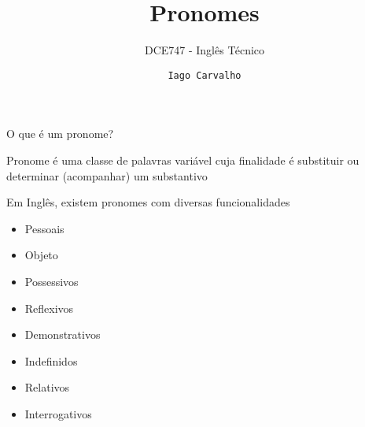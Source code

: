 \documentclass[compress,mathserif,xcolor=table]{beamer}
\title{Pronomes}
\subtitle{DCE747 - Inglês Técnico}
\author{\texttt{Iago Carvalho}}
\institute{\texttt{Departamento de Ciência da Computação}}
\begin{document}
\begin{frame}
\titlepage

\end{frame}


\begin{frame}{O que é um pronome?}

Pronome é uma classe de palavras variável cuja finalidade é substituir ou determinar (acompanhar) um substantivo

\vspace{0.5cm}

Em Inglês, existem pronomes com diversas funcionalidades
\begin{itemize} 
    \item Pessoais
    \item Objeto
    \item Possessivos
    \item Reflexivos
    \item Demonstrativos
    \item Indefinidos
    \item Relativos
    \item Interrogativos
\end{itemize} 

\end{frame}

\end{document}
